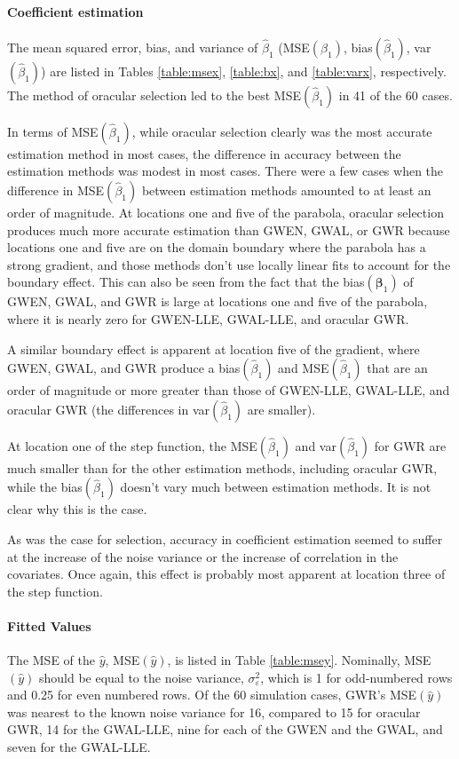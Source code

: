 \documentclass[authoryear, review, 11pt]{elsarticle}
\begin{document}
	\paragraph{Coefficient estimation} The mean squared error, bias, and variance of $\hat{\beta}_1$ (MSE$(\beta_1)$, bias$(\hat{\beta}_1)$, var$(\hat{\beta}_1)$) are listed in Tables \ref{table:msex}, \ref{table:bx}, and \ref{table:varx}, respectively. The method of oracular selection led to the best MSE$(\hat{\beta}_1)$ in 41 of the 60 cases.
	
	In terms of MSE$(\hat{\beta}_1)$, while oracular selection clearly was the most accurate estimation method in most cases, the difference in accuracy between the estimation methods was modest in most cases. There were a few cases when the difference in MSE$(\hat{\beta}_1)$ between estimation methods amounted to at least an order of magnitude. At locations one and five of the parabola, oracular selection produces much more accurate estimation than GWEN, GWAL, or GWR because locations one and five are on the domain boundary where the parabola has a strong gradient, and those methods don't use locally linear fits to account for the boundary effect. This can also be seen from the fact that the bias$(\bm{\beta}_1)$ of GWEN, GWAL, and GWR is large at locations one and five of the parabola, where it is nearly zero for GWEN-LLE, GWAL-LLE, and oracular GWR.
	
	A similar boundary effect is apparent at location five of the gradient, where GWEN, GWAL, and GWR produce a bias$(\hat{\beta}_1)$ and MSE$(\hat{\beta}_1)$ that are an order of magnitude or more greater than those of GWEN-LLE, GWAL-LLE, and oracular GWR (the differences in var$(\hat{\beta}_1)$ are smaller).
	
	At location one of the step function, the MSE$(\hat{\beta}_1)$ and var$(\hat{\beta}_1)$ for GWR are much smaller than for the other estimation methods, including oracular GWR, while the bias$(\hat{\beta}_1)$ doesn't vary much between estimation methods. It is not clear why this is the case.
		
	As was the case for selection, accuracy in coefficient estimation seemed to suffer at the increase of the noise variance or the increase of correlation in the covariates. Once again, this effect is probably most apparent at location three of the step function.	
	
	\paragraph{Fitted Values} The MSE of the $\hat{y}$, MSE$(\hat{y})$, is listed in Table \ref{table:msey}. Nominally, MSE$(\hat{y})$ should be equal to the noise variance, $\sigma_{\varepsilon}^2$, which is 1 for odd-numbered rows and 0.25 for even numbered rows. Of the 60 simulation cases, GWR's MSE$(\hat{y})$ was nearest to the known noise variance for 16, compared to 15 for oracular GWR, 14 for the GWAL-LLE, nine for each of the GWEN and the GWAL, and seven for the GWAL-LLE.
	
\end{document}
